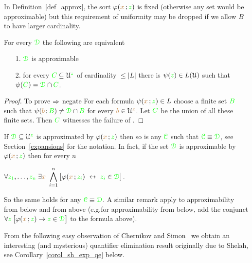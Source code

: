 In Definition~\ref{def_approx}, the sort $\varphi({\color{brown} x}\,;{\color{green} z})$ is fixed (otherwise any set would be approximable) but this requirement of uniformity may be dropped if we allow $B$ to have larger cardinality.

\begin{proposition}\label{lem_approx_nonunif}
For every ${\color{green}\EuScript D}$ the following are equivalent
\begin{itemize}
\item[1.] ${\color{green}\EuScript D}$ is approximable
\item[2.] for every ${\color{green} C}\subseteq\EuScript U^{\color{green} z}$ of cardinality $\le|L|$ there is $\psi({\color{green} z})\in L(\EuScript U)$ such that $\psi({\color{green} C})={\color{green}\EuScript D}\cap{\color{green}C}$.
\end{itemize}
\end{proposition}

\begin{proof}
To prove $\Rightarrow$ negate 
For each formula $\psi({\color{brown} x}\,;{\color{green} z})\in L$ choose a finite set ${\color{green} B}$ such that $\psi({\color{brown} b}\,;{\color{green} B})\neq{\color{green}\EuScript D}\cap{\color{green}B}$ for every ${\color{brown} b}\in\EuScript U^{\color{brown} x}$.
Let ${\color{green} C}$ be the union of all these finite sets.
Then ${\color{green} C}$ witnesses the failure of .
\end{proof}

\begin{remark}\label{prop_approx_el_eq}
If ${\color{green}\EuScript D}\subseteq\EuScript U^{\color{green} z}$ is approximated by $\varphi({\color{brown} x}\,;{\color{green} z})$ then so is any ${\color{green}\EuScript C}$ such that ${\color{green}\EuScript C}\equiv{\color{green}\EuScript D}$, see Section~\ref{expansions} for the notation.
In fact, if the set ${\color{green}\EuScript D}$ is approximable by $\varphi({\color{brown} x}\,;{\color{green} z})$ then for every $n$

\hfil$\displaystyle\A {\gr z_1},\dots,{\gr z_n}\;\E {\mr x}\ \bigwedge^n_{i=1}\big[\phi({\mr x}\,;{\gr z_i})\ \iff\ {\gr z_i}\in{\gr \D}\big]$.

So the same holds for any ${\color{green}\EuScript C}\equiv{\color{green}\EuScript D}$.
A similar remark apply to approximability from below and from above (e.g.\@ for approximability from below, add the conjunct $\forall {\color{green}z}\,\big[\varphi({\color{brown} x}\,;{\color{green} z})\rightarrow {\color{green}z}\in{\color{green}\EuScript D}\big]$ to the formula above).
\end{remark}

From the following easy observation of Chernikov and Simon~\cite{CS} we obtain an interesting (and mysterious) quantifier elimination result originally due to Shelah, see Corollary~\ref{corol_sh_exp_qe} below.

